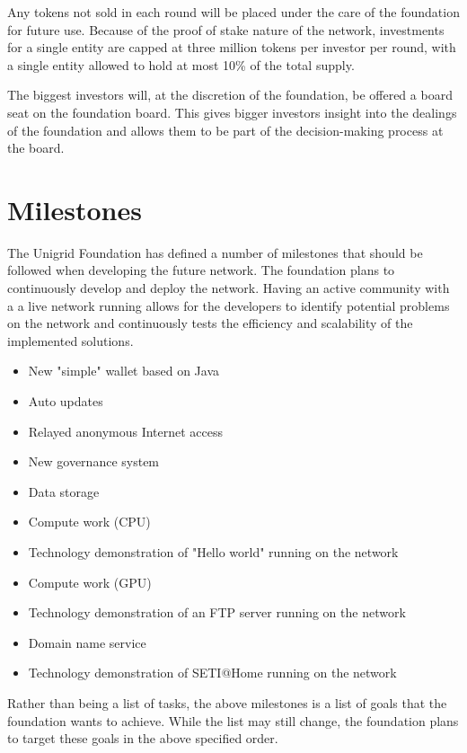 \documentclass{article}
\begin{document}
\vspace{0.6cm}
\noindent Any tokens not sold in each round will be placed under the care of the foundation for future use. Because of the proof of stake nature of the  network, investments for a single entity are capped at three million tokens per investor per round, with a single entity allowed to hold at most 10\% of the total supply.

\noindent The biggest investors will, at the discretion of the foundation, be offered a board seat on the foundation board. This gives bigger investors insight into the dealings of the foundation and allows them to be part of the decision-making process at the board.

\section{Milestones}
The Unigrid Foundation has defined a number of milestones that should be followed when developing the future network. The foundation plans to continuously develop and deploy the network. Having an active community with a a live network running allows for the developers to identify potential problems on the network and continuously tests the efficiency and scalability of the implemented solutions.

\begin{itemize}
  \item New "simple" wallet based on Java
  \item Auto updates
  \item Relayed anonymous Internet access
  \item New governance system
  \item Data storage
  \item Compute work (CPU)
  \item Technology demonstration of "Hello world" running on the network
  \item Compute work (GPU)
  \item Technology demonstration of an FTP server running on the network
  \item Domain name service
  \item Technology demonstration of SETI@Home running on the network
\end{itemize}

\noindent Rather than being a list of tasks, the above milestones is a list of goals that the foundation wants to achieve. While the list may still change, the foundation plans to target these goals in the above specified order.
\end{document}
